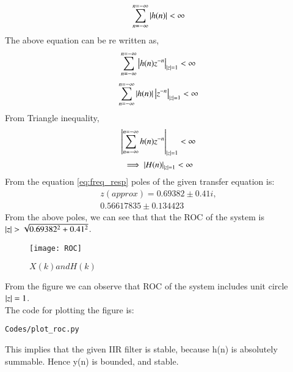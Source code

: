 \documentclass[journal,12pt,twocolumn]{IEEEtran}
\renewcommand\thesection{\arabic{section}}
\begin{document}
\begin{enumerate}[label=\thesection.\arabic*,ref=\thesection.\theenumi]
\begin{equation}
\sum_{n=-\infty}^{n=-\infty} \left\vert h(n)\right\vert<\infty
\end{equation}
The above equation can be re written as,
\begin{equation}
\sum_{n=-\infty}^{n=-\infty} \left\vert h(n)z^{-n}\right\vert_{\left\vert z\right\vert=1}<\infty
\end{equation}
\begin{equation}
\sum_{n=-\infty}^{n=-\infty} \left\vert h(n)\right\vert \left\vert z^{-n}\right\vert_{\left\vert z\right\vert=1}<\infty
\end{equation}
From Triangle inequality,
\begin{equation}
\left\vert\sum_{n=-\infty}^{n=-\infty} h(n)z^{-n}\right\vert_{\left\vert z\right\vert=1}<\infty
\end{equation}
\begin{equation}
\implies \left\vert H(n)\right\vert_{\left\vert z\right\vert=1} < \infty
\end{equation}
From the equation \eqref{eq:freq_resp}
poles of the given transfer equation is:
\begin{equation}
\begin{split}
z(approx) = 0.69382 \pm 0.41i,
\\
 0.56617835 \pm 0.134423
\end{split}  
\end{equation}
From the above poles, we can see that that the ROC of the system is $\left\vert z\right\vert>\sqrt{0.69382^{2}+0.41^{2}}$.
\begin{figure}[!ht]
\centering
\texttt{[image: ROC]}
\caption{$X(k) and H(k)$}
\label{fig:xnhnfft}
\end{figure}
From the figure we can observe that ROC of the system includes unit circle $\left\vert z\right\vert=1$.\\
The code for plotting the figure is:
\begin{lstlisting}
Codes/plot_roc.py
\end{lstlisting}
This implies that the given IIR filter is stable, because h(n) is absolutely summable. Hence y(n) is bounded, and stable.\\


\end{enumerate}
\end{document}

